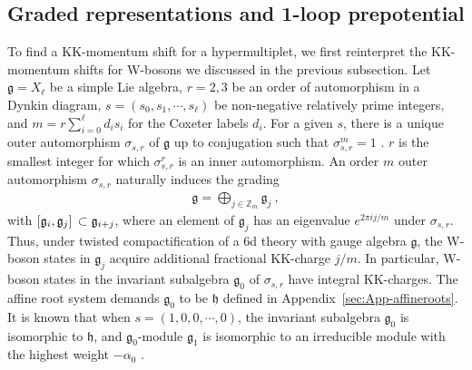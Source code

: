\subsection{Graded representations and 1-loop prepotential }

To find a KK-momentum shift for a hypermultiplet, we first reinterpret the KK-momentum shifts for W-bosons we discussed in the previous subsection. Let $ \mathfrak{g} = X_\ell $ be a simple Lie algebra, $ r = 2, 3 $ be an order of automorphism in a Dynkin diagram, $ s = (s_0, s_1, \cdots, s_\ell) $ be non-negative relatively prime integers, and $ m = r \sum_{i=0}^\ell d_i s_i $ for the Coxeter labels $ d_i $. For a given $ s $, there is a unique outer automorphism $ \sigma_{s, r} $ of $ \mathfrak{g} $ up to conjugation such that $ \sigma_{s,r}^m = 1 $ \cite{kac_infinite_2003}. $ r $ is the smallest integer for which $ \sigma_{s,r}^r $ is an inner automorphism. An order $ m $ outer automorphism $ \sigma_{s, r} $ naturally induces the grading
\begin{align}\label{eq:graded_alg}
\mathfrak{g} = \bigoplus_{j \in \mathbb{Z}_m} \mathfrak{g}_j \ ,
\end{align}
with $ \comm*{\mathfrak{g}_i}{\mathfrak{g}_j} \subset \mathfrak{g}_{i+j}$, where an element of $ \mathfrak{g}_j $ has an eigenvalue $ e^{2\pi i j/m} $ under $ \sigma_{s, r} $. Thus, under twisted compactification of a 6d theory with gauge algebra $ \mathfrak{g} $, the W-boson states in $ \mathfrak{g}_j $ acquire additional fractional KK-charge $ j /m $. In particular, W-boson states in the invariant subalgebra $ \mathfrak{g}_0 $ of $ \sigma_{s, r} $ have integral KK-charges. The affine root system demands $ \mathfrak{g}_0 $ to be $ \mathfrak{h} $ defined in  Appendix~\ref{sec:App-affineroots}. It is known that when $ s = (1, 0, 0, \cdots, 0) $, the invariant subalgebra $ \mathfrak{g}_0 $ is isomorphic to $ \mathfrak{h} $, and $ \mathfrak{g}_0 $-module $ \mathfrak{g}_1 $ is isomorphic to an irreducible module with the highest weight $ -\alpha_0 $ \cite{kac_infinite_2003}.  

